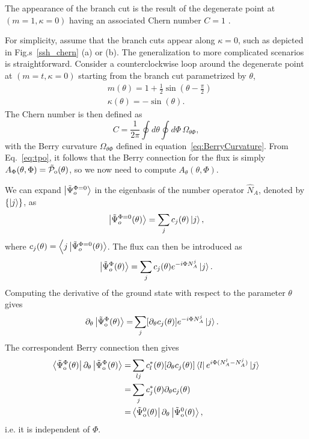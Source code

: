 \documentclass[twocolumn,amsmath,longbibliography,amssymb,superscriptaddress]{revtex4-1}
\newcommand{\tpo}{\tilde{\mathcal{P}}_{\rm o}}
\newcommand{\brapsio}[1]{\bra{\tilde{\Psi}_{{\rm o}}^#1}}
\newcommand{\ketpsio}[1]{\ket{\tilde{\Psi}_{{\rm o}}^#1}}
\begin{document}
The appearance of the branch cut is the result of the degenerate point at $(m=1,\kappa=0)$ having an associated Chern number $C=1$ \cite{Asboth2016}.

For simplicity, assume that the branch cuts appear along $\kappa=0$, such as depicted in Fig.s~\ref{ssh_chern} (a) or (b). The generalization to more complicated scenarios is straightforward. 
Consider a counterclockwise loop around the degenerate point at $(m=t,\kappa=0)$ starting from the branch cut parametrized by $\theta$,
\begin{align*}
& m(\theta) = 1+\frac{1}{2}\sin(\theta-\frac{\pi}{2}) \\
& \kappa(\theta) = -\sin(\theta).
\end{align*}
The Chern number is then defined as
\begin{equation}
C = \frac{1}{2\pi}\oint d\theta\oint d\Phi \, \Omega_{\theta\Phi},
\label{eq:chern}
\end{equation} 
with the Berry curvature $\Omega_{\theta\Phi}$ defined in equation~\eqref{eq:BerryCurvature}. 
From  Eq.~\eqref{eq:tpo}, it follows that the Berry connection for the flux is simply $A_\Phi(\theta,\Phi) = \tpo(\theta)$, so we now need to compute $A_\theta(\theta,\Phi)$. 

We can expand $\ket{\tilde{\Psi}^{\Phi = 0}_o}$ in the eigenbasis of the number operator $\hat{N}_A$, denoted by $\{\ket{j}\}$, as
\begin{equation}
\ket{\tilde{\Psi}^{\Phi = 0}_o(\theta)} = \sum_j c_j(\theta)\ket{j},
\end{equation}
where $c_j(\theta) = \Big\langle j\ket{\tilde{\Psi}^{\Phi = 0}_o(\theta)}$. The flux can then be introduced as
\begin{equation}
\ket{\tilde{\Psi}^{\Phi }_o(\theta)} = \sum_j c_j(\theta)e^{-i \Phi N_A^j}\ket{j}.
\end{equation}
Computing the derivative of the ground state with respect to the parameter $\theta$ gives
\begin{align}
\partial_\theta \ketpsio{\Phi(\theta)} =& \sum_j [\partial_\theta c_j (\theta)]e^{-i\Phi N_A^j}\ket{j}.
\end{align}
The correspondent Berry connection then gives
\begin{align}
\brapsio{\Phi(\theta)}\partial_\theta \ketpsio{\Phi(\theta)} =& \sum_{lj} c^*_l(\theta) [\partial_\theta c_j(\theta)] \bra{l} e^{i\Phi (N_A^l-N_A^j)}\ket{j}\nonumber\\
=& \sum_j  c^*_j(\theta) \partial_\theta c_j(\theta) \nonumber\\
=&\brapsio{0(\theta)}\partial_\theta \ketpsio{0(\theta)}, 
\end{align}
i.e. it is independent of $\Phi$. 
\end{document}
